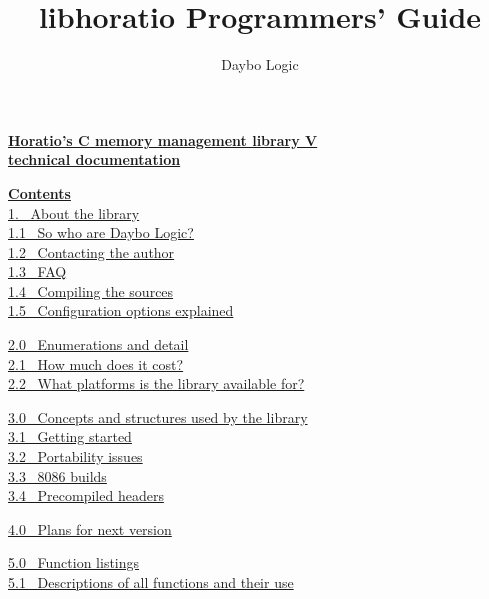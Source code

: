 \documentclass{article}
\begin{document}
\title{libhoratio Programmers' Guide}\author{Daybo Logic}
\maketitle

\par\vspace*{\fill}
\begin{center}

\end{center}

\newpage
\textbf{\underline{Horatio's C memory management library
V}
}
\\
\textbf{\underline{technical documentation}}
\par \textbf{\underline{Contents}}
\\
\href{#About}{1.~ About the library}
\\
\href{#Who}{1.1~ So who are Daybo Logic?}
\\
\href{#Contact}{1.2~ Contacting the author}
\\
\href{#FAQ}{1.3~ FAQ}
\\
\href{#Compile}{1.4~ Compiling the sources}
\\
\href{#Config}{1.5~ Configuration options explained}

\par \href{#Enumerations}{2.0~ Enumerations and detail}\\
\href{#Cost}{2.1~ How much does it cost?}
\\
\href{#Platforms}{2.2~ What platforms is the library available
for?}

\par \href{#Concepts}{3.0~ Concepts and structures used by the
library}
\\
\href{#Starting}{3.1~ Getting started}
\\
\href{#Portability}{3.2~ Portability issues}
\\
\href{#8086}{3.3~ 8086 builds}
\\
\href{#PCH}{3.4~ Precompiled headers}

\href{#Plans}{4.0~ Plans for next version}

\par \href{#Listings}{5.0~ Function listings}\\
\href{#FuncDescs}{5.1~ Descriptions of all functions and their use}
\end{document}
